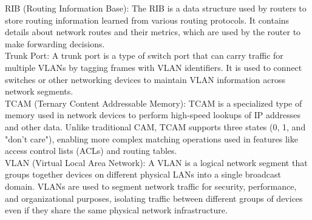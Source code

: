 \documentclass{article}
\begin{document}
RIB (Routing Information Base): The RIB is a data structure used by routers to store routing information learned from various routing protocols. It contains details about network routes and their metrics, which are used by the router to make forwarding decisions.\\

Trunk Port: A trunk port is a type of switch port that can carry traffic for multiple VLANs by tagging frames with VLAN identifiers. It is used to connect switches or other networking devices to maintain VLAN information across network segments.\\

TCAM (Ternary Content Addressable Memory): TCAM is a specialized type of memory used in network devices to perform high-speed lookups of IP addresses and other data. Unlike traditional CAM, TCAM supports three states (0, 1, and "don't care"), enabling more complex matching operations used in features like access control lists (ACLs) and routing tables.\\

VLAN (Virtual Local Area Network): A VLAN is a logical network segment that groups together devices on different physical LANs into a single broadcast domain. VLANs are used to segment network traffic for security, performance, and organizational purposes, isolating traffic between different groups of devices even if they share the same physical network infrastructure.\\
\end{document}
